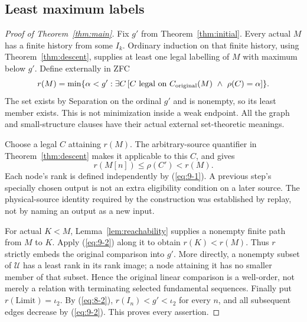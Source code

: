 \subsection{Least maximum labels}
\begin{proof}[Proof of Theorem~\ref{thm:main}]
Fix $g'$ from Theorem~\ref{thm:initial}. Every actual $M$ has a
finite history from some $I_k$. Ordinary induction on that finite
history, using Theorem~\ref{thm:descent}, supplies at least one legal
labelling of $M$ with maximum below $g'$. Define externally in ZFC
\begin{equation}\label{eq:9-1}
 r(M)=\min\{\alpha<g':\exists C\,[C\text{ legal on }
 C_{\rm original}(M)\ \wedge\ \rho(C)=\alpha]\}.            
\end{equation}
The set exists by Separation on the ordinal $g'$ and is nonempty,
so its least member exists. This is not minimization inside a
weak endpoint. All the graph and small-structure clauses have
their actual external set-theoretic meanings.

Choose a legal $C$ attaining $r(M)$. The arbitrary-source quantifier
in Theorem~\ref{thm:descent} makes it applicable to this $C$, and gives
\begin{equation}\label{eq:9-2}
                       r(M[n])\le\rho(C')<r(M).              
\end{equation}
Each node's rank is defined independently by (\ref{eq:9-1}). A previous
step's specially chosen output is not an extra eligibility
condition on a later source. The physical-source identity required
by the construction was established by replay, not by naming an
output as a new input.

For actual $K<M$, Lemma~\ref{lem:reachability} supplies a nonempty
finite path from $M$ to $K$. Apply (\ref{eq:9-2}) along it to obtain
$r(K)<r(M)$. Thus $r$ strictly embeds the original comparison into
$g'$. More directly, a nonempty subset of $\mathscr U$ has a least
rank in its rank image; a node attaining it has no smaller member
of that subset. Hence the original linear comparison is a
well-order, not merely a relation with terminating selected
fundamental sequences. Finally put $r(\mathrm{Limit})=\iota_2$.
By (\ref{eq:8-2}), $r(I_n)<g'<\iota_2$ for every $n$, and all subsequent
edges decrease by (\ref{eq:9-2}). This proves every assertion.
\end{proof}

